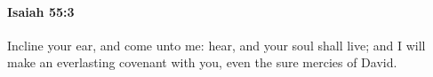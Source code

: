 
		\paragraph{Isaiah 55:3} %
			\label{ISAIAH-55-3}

			Incline your ear, and come unto me: hear, and your soul shall live; and I will make an everlasting covenant with you, even the sure mercies of David.


